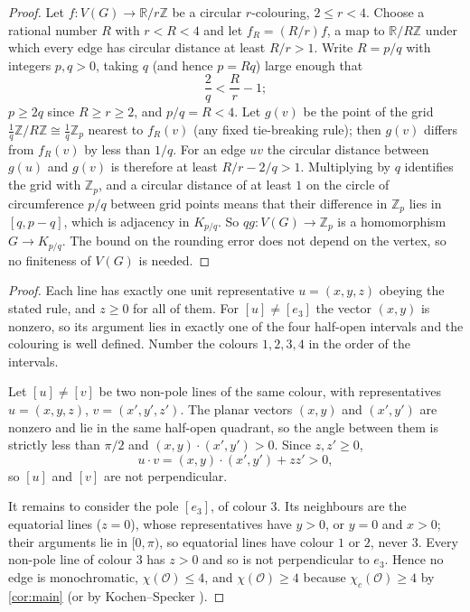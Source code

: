 \documentclass[11pt,a4paper]{article}
\theoremstyle{plain}
\theoremstyle{definition}
\theoremstyle{remark}
\newcommand{\cO}{\mathcal O}
\newcommand{\R}{\mathbb R}
\newcommand{\Z}{\mathbb Z}
\newcommand{\chic}{\chi_c}
\newcommand{\Kc}[2]{K_{#1/#2}}
\begin{document}
\label{pf:round}
\lemround*
\begin{proof}
Let $f\colon V(G)\to\R/r\Z$ be a circular $r$-colouring, $2\le r<4$. Choose a rational number $R$ with $r<R<4$ and let $f_R=(R/r)f$, a map to $\R/R\Z$ under which every edge has circular distance at least $R/r>1$. Write $R=p/q$ with integers $p,q>0$, taking $q$ (and hence $p=Rq$) large enough that
\[
\frac2q<\frac Rr-1 ;
\]
$p\ge2q$ since $R\ge r\ge2$, and $p/q=R<4$. Let $g(v)$ be the point of the grid $\tfrac1q\Z/R\Z\cong\tfrac1q\Z_p$ nearest to $f_R(v)$ (any fixed tie-breaking rule); then $g(v)$ differs from $f_R(v)$ by less than $1/q$. For an edge $uv$ the circular distance between $g(u)$ and $g(v)$ is therefore at least $R/r-2/q>1$. Multiplying by $q$ identifies the grid with $\Z_p$, and a circular distance of at least $1$ on the circle of circumference $p/q$ between grid points means that their difference in $\Z_p$ lies in $[q,p-q]$, which is adjacency in $\Kc pq$. So $qg\colon V(G)\to\Z_p$ is a homomorphism $G\to\Kc pq$. The bound on the rounding error does not depend on the vertex, so no finiteness of $V(G)$ is needed.
\end{proof}

\label{pf:fourcol}
\propfourcol*
\begin{proof}
Each line has exactly one unit representative $u=(x,y,z)$ obeying the stated rule, and $z\ge0$ for all of them. For $[u]\ne[e_3]$ the vector $(x,y)$ is nonzero, so its argument lies in exactly one of the four half-open intervals and the colouring is well defined. Number the colours $1,2,3,4$ in the order of the intervals.

Let $[u]\ne[v]$ be two non-pole lines of the same colour, with representatives $u=(x,y,z)$, $v=(x',y',z')$. The planar vectors $(x,y)$ and $(x',y')$ are nonzero and lie in the same half-open quadrant, so the angle between them is strictly less than $\pi/2$ and $(x,y)\cdot(x',y')>0$. Since $z,z'\ge0$,
\[
u\cdot v=(x,y)\cdot(x',y')+zz'>0 ,
\]
so $[u]$ and $[v]$ are not perpendicular.

It remains to consider the pole $[e_3]$, of colour $3$. Its neighbours are the equatorial lines ($z=0$), whose representatives have $y>0$, or $y=0$ and $x>0$; their arguments lie in $[0,\pi)$, so equatorial lines have colour $1$ or $2$, never $3$. Every non-pole line of colour $3$ has $z>0$ and so is not perpendicular to $e_3$. Hence no edge is monochromatic, $\chi(\cO)\le4$, and $\chi(\cO)\ge4$ because $\chic(\cO)\ge4$ by \cref{cor:main} (or by Kochen--Specker \cite{KS67}).
\end{proof}
\end{document}
